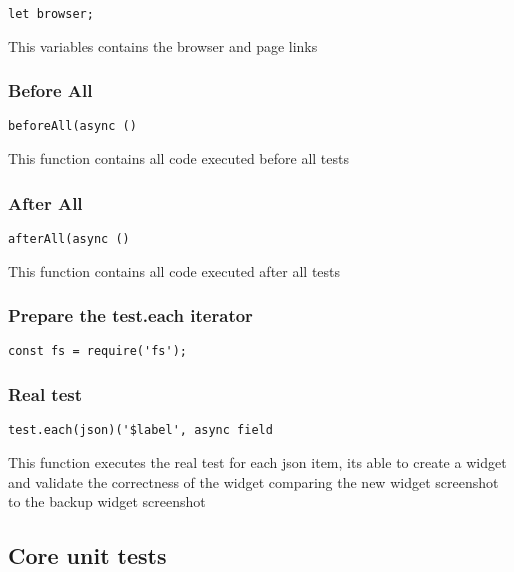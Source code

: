 \documentclass[a4paper]{article}
\begin{document}
\begin{lstlisting}
let browser;
\end{lstlisting}

This variables contains the browser and page links

\hypertarget{toc474}{}
\subsubsection{Before All}

\begin{lstlisting}
beforeAll(async ()
\end{lstlisting}

This function contains all code executed before all tests

\hypertarget{toc475}{}
\subsubsection{After All}

\begin{lstlisting}
afterAll(async ()
\end{lstlisting}

This function contains all code executed after all tests

\hypertarget{toc476}{}
\subsubsection{Prepare the test.each iterator}

\begin{lstlisting}
const fs = require('fs');
\end{lstlisting}

\hypertarget{toc477}{}
\subsubsection{Real test}

\begin{lstlisting}
test.each(json)('$label', async field
\end{lstlisting}

This function executes the real test for each json item, its able to
create a widget and validate the correctness of the widget comparing
the new widget screenshot to the backup widget screenshot

\hypertarget{toc478}{}
\subsection{Core unit tests}
\end{document}
